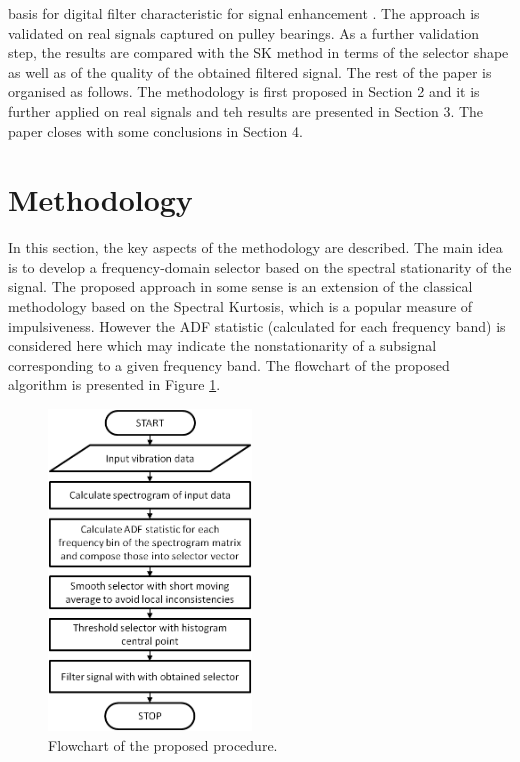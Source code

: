 \documentclass[11pt]{article}
\begin{document}
basis for digital filter characteristic for signal enhancement \cite{obuchowski2014selection}. The approach is validated on real signals captured on pulley bearings. As a further validation step, the results are compared with the SK method in terms of the selector shape as well as of the quality of the obtained filtered signal. The rest of the paper is organised as follows. The methodology is first proposed in Section 2 and it is further applied on real signals and teh results are presented in Section 3. The paper closes with some conclusions in Section 4. 

\section{Methodology}

In this section, the key aspects of the methodology are described. The main idea is to develop a frequency-domain selector based on the spectral stationarity of the signal. The proposed approach in some sense is an extension of the classical methodology based on the Spectral Kurtosis, which is a popular measure of impulsiveness. However the ADF statistic (calculated for each frequency band) is considered here which may indicate the nonstationarity of a subsignal corresponding to a given frequency band. The flowchart of the proposed algorithm is presented in Figure \ref{f:block}.

\begin{figure}[!ht]
\begin{center}
\includegraphics[width=0.48\textwidth]{block}
\caption{Flowchart of the proposed procedure. \label{f:block}}
\end{center}
\end{figure}
\end{document}
